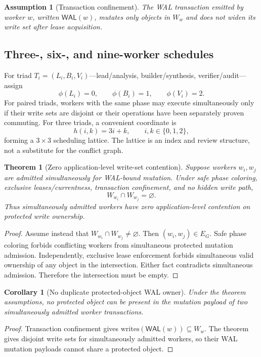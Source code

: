 \documentclass[11pt]{article}
\newtheorem{theorem}{Theorem}
\newtheorem{corollary}{Corollary}
\newtheorem{assumption}{Assumption}
\newcommand{\WAL}{\mathsf{WAL}}
\begin{document}
\begin{assumption}[Transaction confinement]
The WAL transaction emitted by worker \(w\), written \(\WAL(w)\), mutates only
objects in \(W_w\) and does not widen its write set after lease acquisition.
\end{assumption}

\subsection{Three-, six-, and nine-worker schedules}

For triad \(T_i=(L_i,B_i,V_i)\)---lead/analysis, builder/synthesis,
verifier/audit---assign
\[
\phi(L_i)=0,\qquad\phi(B_i)=1,\qquad\phi(V_i)=2.
\]
For paired triads, workers with the same phase may execute simultaneously only
if their write sets are disjoint or their operations have been separately
proven commuting.  For three triads, a convenient coordinate is
\[
h(i,k)=3i+k,\qquad i,k\in\{0,1,2\},
\]
forming a \(3\times3\) scheduling lattice.  The lattice is an index and review
structure, not a substitute for the conflict graph.

\begin{theorem}[Zero application-level write-set contention]
Suppose workers \(w_i,w_j\) are admitted simultaneously for WAL-bound mutation.
Under safe phase coloring, exclusive leases/currentness, transaction confinement,
and no hidden write path,
\[
W_{w_i}\cap W_{w_j}=\varnothing.
\]
Thus simultaneously admitted workers have zero application-level contention on
protected write ownership.
\end{theorem}

\begin{proof}
Assume instead that
\(W_{w_i}\cap W_{w_j}\neq\varnothing\).  Then
\((w_i,w_j)\in E_G\).  Safe phase coloring forbids conflicting workers from
simultaneous protected mutation admission.  Independently, exclusive lease
enforcement forbids simultaneous valid ownership of any object in the
intersection.  Either fact contradicts simultaneous admission.  Therefore the
intersection must be empty.
\end{proof}

\begin{corollary}[No duplicate protected-object WAL owner]
Under the theorem assumptions, no protected object can be present in the
mutation payload of two simultaneously admitted worker transactions.
\end{corollary}

\begin{proof}
Transaction confinement gives
\(\mathrm{writes}(\WAL(w))\subseteq W_w\).  The theorem gives disjoint write
sets for simultaneously admitted workers, so their WAL mutation payloads cannot
share a protected object.
\end{proof}
\end{document}
